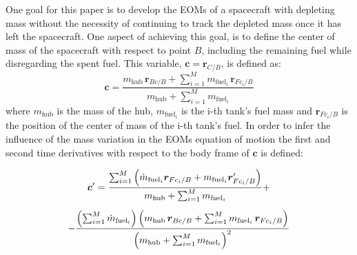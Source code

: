 One goal for this paper is to develop the EOMs of a spacecraft with depleting mass without the necessity of continuing to track the depleted mass once it has left the spacecraft. One aspect of achieving this goal, is to define the center of mass of the spacecraft with respect to point $B$, including the remaining fuel while disregarding the spent fuel. This variable, $\bm{c} = \bm{r}_{C/B}$, is defined as:
\begin{equation}\label{eq:def_rCB}
	\bm{c}=\frac{m_{\text{hub}}\,\bm{r}_{Bc/B} + \sum_{i=1}^{M}m_{\text{fuel}_i}\,\bm{r}_{Fc_i/B}}{m_{\text{hub}}+ \sum_{i=1}^{M}m_{\text{fuel}_i}}
\end{equation}
where $m_{\text{hub}}$ is the mass of the hub, $m_{\text{fuel}_i}$ is the i-th tank's fuel mass and $\bm{r}_{Fc_i/B}$ is the position of the center of mass of the i-th tank's fuel.
In order to infer the influence of the mass variation in the EOMs equation of motion the first and second time derivatives with respect to the body frame of $\bm c$ is defined:

\begin{multline}\label{eq:eq17}
	\bm{c}' = \frac{\sum_{i=1}^{M}\left(\dot{m}_{\text{fuel}_i}\bm{r}_{Fc_i/B} + m_{\text{fuel}_i}\bm{r}'_{Fc_i/B}\right)}{m_{\text{hub}}+ \sum_{i=1}^{M}m_{\text{fuel}_i}} + \vspace{5pt}\\
	- \frac{\left(\sum_{i=1}^{M}\dot{m}_{\text{fuel}_i}\right)\left(m_{\text{hub}}\,\bm{r}_{Bc/B} + \sum_{i=1}^{M}m_{\text{fuel}_i}\,\bm{r}_{Fc_i/B}\right)}{\left(m_{\text{hub}}+ \sum_{i=1}^{M}m_{\text{fuel}_i}\right)^2}
\end{multline}

